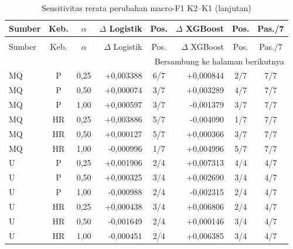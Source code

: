 \begingroup
\small
\setlength{\tabcolsep}{4pt}
\begin{longtable}{lccrcrcc}
\caption{Sensitivitas rerata perubahan macro-F1 K2--K1}\label{tab:hasil-sensitivitas-teknikal}\\
\toprule
Sumber & Keb. & $\alpha$ & $\Delta$ Logistik & Pos. & $\Delta$ XGBoost & Pos. & Pas./7 \\
\midrule
\endfirsthead
\caption[]{Sensitivitas rerata perubahan macro-F1 K2--K1 (lanjutan)}\\
\toprule
Sumber & Keb. & $\alpha$ & $\Delta$ Logistik & Pos. & $\Delta$ XGBoost & Pos. & Pas./7 \\
\midrule
\endhead
\midrule
\multicolumn{8}{r}{Bersambung ke halaman berikutnya} \\
\endfoot
\endlastfoot
MQ & P & 0,25 & +0,003388 & 6/7 & +0,000844 & 2/7 & 7/7 \\
MQ & P & 0,50 & +0,000074 & 3/7 & +0,003289 & 4/7 & 7/7 \\
MQ & P & 1,00 & +0,000597 & 3/7 & -0,001379 & 3/7 & 7/7 \\
MQ & HR & 0,25 & +0,003886 & 5/7 & -0,004090 & 1/7 & 7/7 \\
MQ & HR & 0,50 & +0,000127 & 5/7 & +0,000366 & 3/7 & 7/7 \\
MQ & HR & 1,00 & -0,000996 & 1/7 & +0,004996 & 5/7 & 7/7 \\
U & P & 0,25 & +0,001906 & 2/4 & +0,007313 & 4/4 & 4/7 \\
U & P & 0,50 & +0,000325 & 3/4 & +0,002690 & 3/4 & 4/7 \\
U & P & 1,00 & -0,000988 & 2/4 & -0,002315 & 2/4 & 4/7 \\
U & HR & 0,25 & +0,000438 & 3/4 & +0,006806 & 2/4 & 4/7 \\
U & HR & 0,50 & -0,001649 & 2/4 & +0,000146 & 3/4 & 4/7 \\
U & HR & 1,00 & -0,000451 & 2/4 & +0,006385 & 3/4 & 4/7 \\
\bottomrule
\end{longtable}
\endgroup


